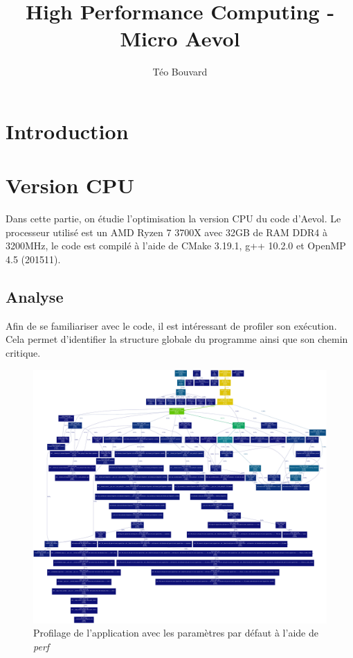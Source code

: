 \documentclass[a4paper, 10pt, twoside]{article}
\begin{document}
\title{High Performance Computing - Micro Aevol}
\author{T\'eo Bouvard}
\maketitle

\section{Introduction}

\section{Version CPU}

Dans cette partie, on étudie l'optimisation la version CPU du code d'Aevol. Le processeur utilisé est un AMD Ryzen 7 3700X avec 32GB de RAM DDR4 à 3200MHz, le code est compilé à l'aide de CMake 3.19.1, g++ 10.2.0 et OpenMP 4.5 (201511).

\subsection{Analyse}

Afin de se familiariser avec le code, il est intéressant de profiler son exécution. Cela permet d'identifier la structure globale du programme ainsi que son chemin critique.

\begin{figure}
	\includegraphics[width=\linewidth]{img/init_profile_debug.pdf}
	\caption{Profilage de l'application avec les paramètres par défaut à l'aide de \textit{perf}}
\end{figure}
\end{document}
